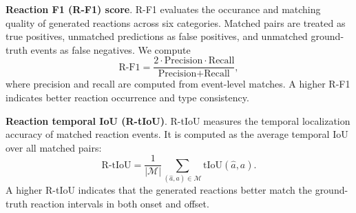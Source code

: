 \textbf{Reaction F1 (R-F1) score}. R-F1 evaluates the occurance and matching quality of generated reactions across six categories. Matched pairs are treated as true positives, unmatched predictions as false positives, and unmatched ground-truth events as false negatives. We compute
{
\footnotesize
\begin{equation}
    \text{R-F1}=\frac{2\cdot\text{Precision}\cdot\text{Recall}}{\text{Precision}+\text{Recall}},
\end{equation}
}where precision and recall are computed from event-level matches. A higher R-F1 indicates better reaction occurrence and type consistency.

\textbf{Reaction temporal IoU (R-tIoU)}. R-tIoU measures the temporal localization accuracy of matched reaction events. It is computed as the average temporal IoU over all matched pairs:
{
\footnotesize
\begin{equation}
    \text{R-tIoU}=\frac{1}{|\mathcal{M}|}\sum_{(\widehat{a},a)\in\mathcal{M}}\text{tIoU}(\widehat{a},a).
\end{equation}
}A higher R-tIoU indicates that the generated reactions better match the ground-truth reaction intervals in both onset and offset.

